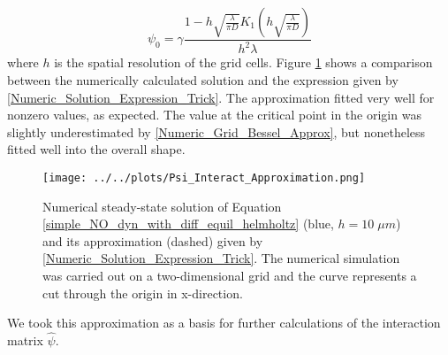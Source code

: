 \documentclass[10pt,a4paper]{article}
\begin{document}
\begin{equation}
\psi_0 = \gamma \frac{1-h\sqrt{\frac{\lambda}{\pi D}} K_1\left( h\sqrt{\frac{\lambda}{\pi D}}\right) }{h^2 \lambda}
\label{Numeric_Grid_Bessel_Approx}
\end{equation}
where $h$ is the spatial resolution of the grid cells. Figure \ref{Psi_Approximation_Compare} shows a comparison between the numerically calculated solution and the expression given by \ref{Numeric_Solution_Expression_Trick}. The approximation fitted very well for nonzero values, as expected. The value at the critical point in the origin was slightly underestimated by \eqref{Numeric_Grid_Bessel_Approx}, but nonetheless fitted well into the overall shape.
\begin{figure}
\begin{center}
\texttt{[image: ../../plots/Psi\_Interact\_Approximation.png]}
\end{center}
\caption{Numerical steady-state solution of Equation \eqref{simple_NO_dyn_with_diff_equil_helmholtz} (blue, $h=10\;\mu m$) and its approximation (dashed) given by \eqref{Numeric_Solution_Expression_Trick}. The numerical simulation was carried out on a two-dimensional grid and the curve represents a cut through the origin in x-direction.}
\label{Psi_Approximation_Compare}
\end{figure}
We took this approximation as a basis for further calculations of the interaction matrix $\hat{\psi}$.
\end{document}
